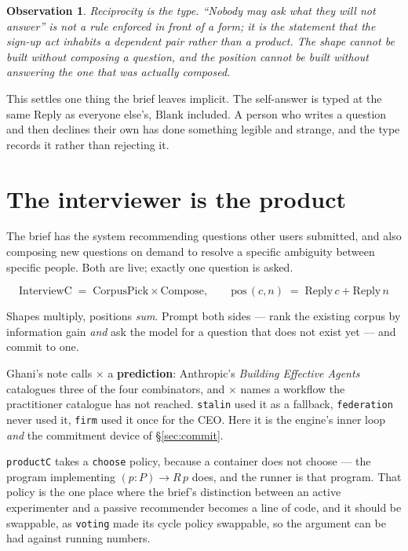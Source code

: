 \documentclass[11pt,a4paper]{article}
\newtheorem*{obs}{Observation}
\newcommand{\Reply}{\mathrm{Reply}}
\begin{document}
\begin{obs}
Reciprocity is the type. ``Nobody may ask what they will not answer'' is not a
rule enforced in front of a form; it is the statement that the sign-up act
inhabits a dependent pair rather than a product. The shape cannot be built
without composing a question, and the position cannot be built without answering
\emph{the one that was actually composed}.
\end{obs}

This settles one thing the brief leaves implicit. The self-answer is typed at the
same $\Reply$ as everyone else's, $\mathrm{Blank}$ included. A person who writes
a question and then declines their own has done something legible and strange,
and the type records it rather than rejecting it.

\section{The interviewer is the product}

The brief has the system recommending questions other users submitted, and also
composing new questions on demand to resolve a specific ambiguity between
specific people. Both are live; exactly one question is asked.

\[
  \mathrm{InterviewC} \;=\; \mathrm{CorpusPick} \times \mathrm{Compose},
  \qquad
  \mathrm{pos}\,(c,n) \;=\; \Reply\,c + \Reply\,n
\]

Shapes multiply, positions \emph{sum}. Prompt both sides --- rank the existing
corpus by information gain \emph{and} ask the model for a question that does not
exist yet --- and commit to one.

\begin{notebox}
Ghani's note calls $\times$ a \textbf{prediction}: Anthropic's \emph{Building
Effective Agents} catalogues three of the four combinators, and $\times$ names a
workflow the practitioner catalogue has not reached. \texttt{stalin} used it as a
fallback, \texttt{federation} never used it, \texttt{firm} used it once for the
CEO. Here it is the engine's inner loop \emph{and} the commitment device of
\S\ref{sec:commit}.
\end{notebox}

\texttt{productC} takes a \texttt{choose} policy, because a container does not
choose --- the program implementing $(p : P) \to R\,p$ does, and the runner is
that program. That policy is the one place where the brief's distinction between
an active experimenter and a passive recommender becomes a line of code, and it
should be swappable, as \texttt{voting} made its cycle policy swappable, so the
argument can be had against running numbers.
\end{document}
